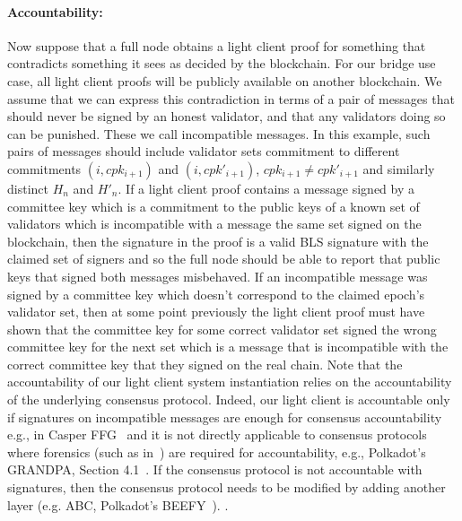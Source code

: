 \noindent\paragraph{Accountability:} Now suppose that a full node obtains a light client proof for something that contradicts something it sees as decided 
by the blockchain. For our bridge use case, all light client proofs will be publicly available on another blockchain. We assume that we can express this 
contradiction in terms of a pair of messages that should never be signed by an honest validator, and that any validators doing so can be punished. 
These we call incompatible messages. In this example, such pairs of messages should include validator sets commitment to different 
commitments $(i,cpk_{i+1})$ and $(i,cpk'_{i+1})$, $cpk_{i+1} \neq cpk'_{i+1}$ and similarly distinct $H_n$ and $H'_n$. If a light client proof 
contains a message signed by a committee key which is a commitment to the public keys of a known set of validators which is incompatible with a 
message the same set signed on the blockchain, then the signature in the proof is a valid BLS signature with the claimed set of signers and so the full 
node should be able to report that public keys that signed both messages misbehaved. If an incompatible message was signed by a committee key 
which doesn't correspond to the claimed epoch's validator set, then at some point previously the light client proof must have shown that the committee 
key for some correct validator set signed the wrong committee key for the next set which is a message that is incompatible with the correct committee 
key that they signed on the real chain. Note that the accountability of our light client system instantiation relies on the accountability of the 
underlying consensus protocol. Indeed, our light client is accountable only if signatures on incompatible messages are enough for consensus 
accountability e.g., in Casper FFG~\cite{CasperFFG} and it is not directly applicable to consensus protocols where forensics (such as in~\cite{forensics}) 
are required for accountability, e.g., Polkadot's GRANDPA, Section 4.1~\cite{GRANDPA}. If the consensus protocol is not accountable with signatures, 
then the consensus protocol needs to be modified by adding another layer (e.g. ABC\cite{ABC}, Polkadot's BEEFY~\cite{BEEFY}).
\vspace{-0.05in}.

